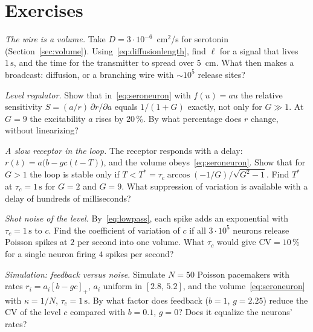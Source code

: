 \section{Exercises}

\begin{exercise}[\lvlA]
\label{ex:05:1}
\emph{The wire is a volume.} Take $D=3\cdot10^{-6}$~cm$^2$/s for serotonin (Section~\ref{sec:volume}). Using~\eqref{eq:diffusionlength}, find $\ell$ for a signal that lives $1\,\text{s}$, and the time for the transmitter to spread over $5$~cm. What then makes  a broadcast: diffusion, or a branching wire with $\sim10^5$ release sites?
\end{exercise}

\begin{exercise}[\lvlA]
\label{ex:05:2}
\emph{Level regulator.} Show that in~\eqref{eq:seroneuron} with $f(u)=au$ the relative sensitivity $S=(a/r)\,\partial r/\partial a$ equals $1/(1+G)$ exactly, not only for $G\gg1$. At $G=9$ the excitability $a$ rises by $20\,\%$. By what percentage does $r$ change, without linearizing?
\end{exercise}

\begin{exercise}[\lvlB]
\label{ex:05:3}
\emph{A slow receptor in the loop.} The  receptor responds with a delay: $r(t)=a\bigl(b-gc(t-T)\bigr)$, and the volume obeys~\eqref{eq:seroneuron}. Show that for $G>1$ the loop is stable only if $T<T^*=\tau_c\arccos(-1/G)/\sqrt{G^2-1}$. Find $T^*$ at $\tau_c=1\,\text{s}$ for $G=2$ and $G=9$. What suppression of variation is available with a delay of hundreds of milliseconds?
\end{exercise}

\begin{exercise}[\lvlB]
\label{ex:05:4}
\emph{Shot noise of the level.} By~\eqref{eq:lowpass}, each spike adds an exponential with $\tau_c=1\,\text{s}$ to $c$. Find the coefficient of variation of $c$ if all $3\cdot10^5$  neurons release Poisson spikes at $2$ per second into one volume. What $\tau_c$ would give $\mathrm{CV}=10\,\%$ for a single neuron firing $4$ spikes per second?
\end{exercise}

\begin{exercise}[\lvlB]
\label{ex:05:5}
\emph{Simulation: feedback versus noise.} Simulate $N=50$ Poisson pacemakers with rates $r_i=a_i[b-gc]_+$, $a_i$ uniform in $[2.8,\,5.2]$, and the volume~\eqref{eq:seroneuron} with $\kappa=1/N$, $\tau_c=1\,\text{s}$. By what factor does feedback ($b=1$, $g=2.25$) reduce the CV of the level $c$ compared with $b=0.1$, $g=0$? Does it equalize the neurons' rates?
\end{exercise}

